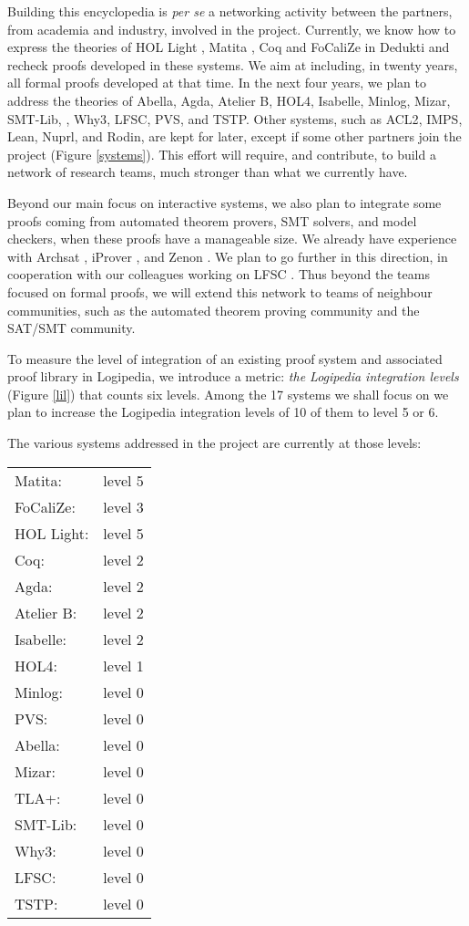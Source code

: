 Building this encyclopedia is {\em per se} a networking activity
between the partners, from academia and industry, involved in the
project.  Currently, we know how to express the theories of {\sc HOL
  Light} \cite{Assaf12}, {\sc Matita} \cite{Assaf15}, {\sc Coq} and
{\sc FoCaliZe} \cite{Cauderlier16} in {\sc Dedukti} and recheck proofs
developed in these systems.  We aim at including, in twenty years, all
formal proofs developed at that time.
In the next four years, we plan to address the theories of {\sc
  Abella}, {\sc Agda}, {\sc Atelier B}, {\sc HOL4}, {\sc Isabelle},
{\sc Minlog}, {\sc Mizar}, {\sc SMT-Lib}, \tlaplus, {\sc Why3}, {\sc
  LFSC}, {\sc PVS}, and {\sc TSTP}.  Other systems, such as {\sc
  ACL2}, {\sc IMPS}, {\sc Lean}, {\sc Nuprl}, and {\sc Rodin}, are
kept for later, except if some other partners join the project (Figure
\ref{systems}). This effort will require, and contribute, to build a
network of research teams, much stronger than what we currently have.

Beyond our main focus on interactive systems, we also plan to
integrate some proofs coming from automated theorem provers, SMT
solvers, and model checkers, when these proofs have a manageable
size. We already have experience with Archsat \cite{Bury19}, iProver
\cite{Burel10}, and Zenon \cite{CauderlierHalmagrand15}. We plan to go
further in this direction, in cooperation with our colleagues working
on LFSC \cite{Stump09}. Thus beyond the teams focused on formal proofs, we
will extend this network to teams of neighbour communities, such as
the automated theorem proving community and the SAT/SMT community.

To measure the level of integration of an existing proof system and
associated proof library in {\sc Logipedia}, we introduce a metric:
{\em the {\sc Logipedia} integration levels} (Figure \ref{lil}) that
counts six levels.  Among the 17 systems we shall focus on we plan to
increase the {\sc Logipedia} integration levels of 10 of them to level
5 or 6.

The various systems addressed in the project are currently at those levels:

\begin{tabular}{ll}
Matita:& level 5\\
FoCaliZe:& level 3\\
HOL Light:& level 5\\
Coq:& level 2\\
Agda:& level 2\\
Atelier B:& level 2\\
Isabelle:& level 2\\
HOL4:& level 1\\
Minlog:& level 0\\
PVS:& level 0\\
Abella:& level 0\\
Mizar:& level 0\\
TLA+:& level 0\\
SMT-Lib:& level 0\\
Why3:& level 0\\
LFSC:& level 0\\
TSTP:& level 0\\
\end{tabular}

